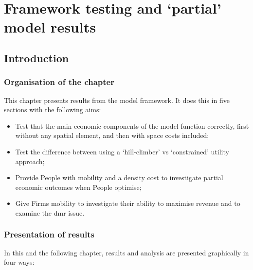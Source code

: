 \chapter{Framework testing and `partial' model results \label{chapter:models}} 

\section{Introduction}

\subsection{Organisation of the chapter}

This chapter presents results from the model framework. It does this in five sections with the following aims:

\begin{itemize}
	\item Test that the main economic components of the model function correctly, first without any spatial element, and then with space costs included;
	\item Test the difference between using a `hill-climber' vs ‘constrained' utility approach;
	\item Provide People with mobility and a density cost to investigate partial economic outcomes when People optimise;
	\item Give Firms mobility to investigate their ability to maximise revenue and to examine the \gls{dmr} issue.
\end{itemize}


\subsection{Presentation of results \label{sec:resultspresent}}

In this and the following chapter, results and analysis are presented graphically in four ways:

